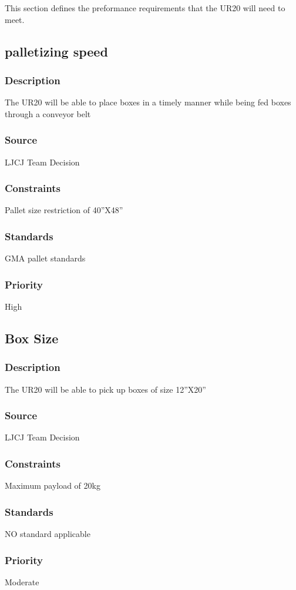 This section defines the preformance requirements that the UR20 will need to meet. 

\subsection{palletizing speed}
\subsubsection{Description}
The UR20 will be able to place boxes in a timely manner while being fed boxes through a conveyor belt 
\subsubsection{Source}
LJCJ Team Decision
\subsubsection{Constraints}
Pallet size restriction of 40''X48''
\subsubsection{Standards}
GMA pallet standards
\subsubsection{Priority}
High

\subsection{Box Size}
\subsubsection{Description}
The UR20 will be able to pick up boxes of size 12''X20'' 
\subsubsection{Source}
LJCJ Team Decision
\subsubsection{Constraints}
Maximum payload of 20kg 
\subsubsection{Standards}
NO standard applicable
\subsubsection{Priority}
Moderate

